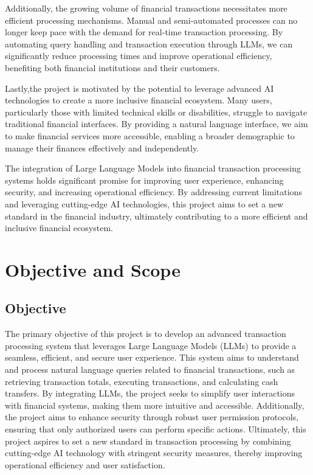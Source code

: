 \noindent Additionally, the growing volume of financial transactions necessitates more efficient processing mechanisms. Manual and semi-automated processes can no longer keep pace with the demand for real-time transaction processing. By automating query handling and transaction execution through LLMs, we can significantly reduce processing times and improve operational efficiency, benefiting both financial institutions and their customers.

\noindent Lastly,the project is motivated by the potential to leverage advanced AI technologies to create a more inclusive financial ecosystem. Many users, particularly those with limited technical skills or disabilities, struggle to navigate traditional financial interfaces. By providing a natural language interface, we aim to make financial services more accessible, enabling a broader demographic to manage their finances effectively and independently.

\noindent The integration of Large Language Models into financial transaction processing systems holds significant promise for improving user experience, enhancing security, and increasing operational efficiency. By addressing current limitations and leveraging cutting-edge AI technologies, this project aims to set a new standard in the financial industry, ultimately contributing to a more efficient and inclusive financial ecosystem.

\clearpage

\section{Objective and Scope}

\subsection{Objective}

The primary objective of this project is to develop an advanced transaction processing system that leverages Large Language Models (LLMs) to provide a seamless, efficient, and secure user experience. This system aims to understand and process natural language queries related to financial transactions, such as retrieving transaction totals, executing transactions, and calculating cash transfers. By integrating LLMs, the project seeks to simplify user interactions with financial systems, making them more intuitive and accessible. Additionally, the project aims to enhance security through robust user permission protocols, ensuring that only authorized users can perform specific actions. Ultimately, this project aspires to set a new standard in transaction processing by combining cutting-edge AI technology with stringent security measures, thereby improving operational efficiency and user satisfaction.

